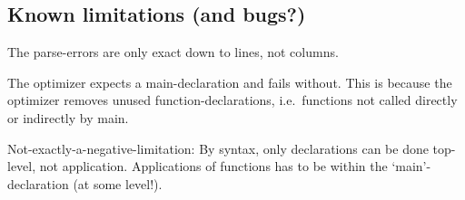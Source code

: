 \subsection{Known limitations (and bugs?)}
The parse-errors are only exact down to lines, not columns.

The optimizer expects a main-declaration and fails without. This is because the optimizer removes unused function-declarations, i.e.\ functions not called directly or indirectly by main.

Not-exactly-a-negative-limitation: By syntax, only declarations can be done top-level, not application. Applications of functions has to be within the `main'-declaration (at some level!).
